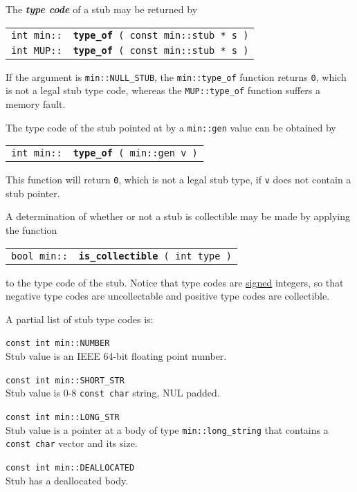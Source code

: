 \documentclass[12pt]{article}
\makeatletter
\newcommand{\key}[1]{{\bf \em #1}\index{#1}}
\newcommand{\ttindex}[1]{\index{#1@{\tt #1}}}
\newcommand{\minindex}[1]{\ttindex{min::#1}\ttindex{#1}}
\newcommand{\MUPindex}[1]{\ttindex{MUP::#1}\ttindex{#1}}
\newcommand{\EOL}{\penalty \exhyphenpenalty}
\newenvironment{indpar}[1][0.3in]%
	{\begin{list}{}%
		     {\setlength{\itemsep}{0in}%
		      \setlength{\topsep}{0in}%
		      \setlength{\parsep}{1ex}%
		      \setlength{\labelwidth}{#1}%
		      \setlength{\leftmargin}{#1}%
		      \addtolength{\leftmargin}{\labelsep}}%
	 \item}%
	{\end{list}}
\newcommand{\LABEL}[1]{\label{#1}}
\newcommand{\MINKEY}[1]{{\tt \bf #1}\minindex{#1}}
\newcommand{\MUPKEY}[1]{{\tt \bf #1}\MUPindex{#1}}
\makeatother
\begin{document}
The \key{type code} of a stub may be returned by

\begin{indpar}\begin{tabular}{r@{}l}
\verb|int min::| & \MINKEY{type\_of}\verb| ( const min::stub * s )|
\LABEL{MIN::TYPE_OF} \\
\verb|int MUP::| & \MUPKEY{type\_of}\verb| ( const min::stub * s )|
\LABEL{MUP::TYPE_OF}
\end{tabular}\end{indpar}

If the argument is {\tt min::NULL\_STUB},
the {\tt min::type\_of} function returns {\tt 0}, which is not
a legal stub type code,
whereas the {\tt MUP::\EOL type\_\EOL of} function suffers a memory fault.

The type code of the stub pointed at by a {\tt min::gen} value
can be obtained by

\begin{indpar}\begin{tabular}{r@{}l}
\verb|int min::| & \MINKEY{type\_of}\verb| ( min::gen v )|
\LABEL{MIN::TYPE_OF_GEN}
\end{tabular}\end{indpar}

This function will return {\tt 0}, which is not a legal stub type,
if {\tt v} does not contain a stub pointer.

A determination of whether or not a stub is collectible may be made
by applying the function

\begin{indpar}\begin{tabular}{r@{}l}
\verb|bool min::| & \MINKEY{is\_collectible}\verb| ( int type )|
\LABEL{MIN::IS_COLLECTIBLE}
\end{tabular}\end{indpar}

to the type code of the stub.  Notice that type codes are \underline{signed}
integers, so that negative type codes are uncollectable and positive type codes
are collectible.

A partial list of stub type codes is:

\begin{indpar}
\begin{list}{}{}
\item[{\tt const int min::NUMBER}]~\\
Stub value is an IEEE 64-bit floating point number.
\item[{\tt const int min::SHORT\_STR}]~\\
Stub value is 0-8 \verb|const char| string, NUL padded.
\item[{\tt const int min::LONG\_STR}]~\\
Stub value is a pointer at a body of type {\tt min::long\_\EOL string}
that contains a \verb|const char| vector and its size. 
\item[{\tt const int min::DEALLOCATED}]~\\
Stub has a deallocated body.
\end{list}
\end{indpar}
\end{document}
